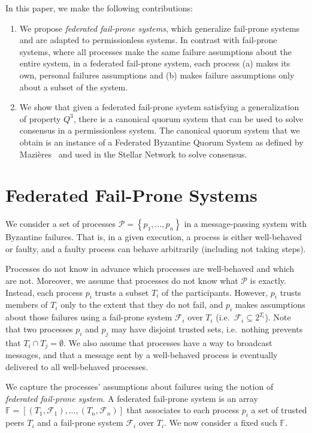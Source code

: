 \documentclass[11pt]{article}
\begin{document}
In this paper, we make the following contributions:
\begin{enumerate}
  \item
    We propose \emph{federated fail-prone systems}, which generalize fail-prone systems and are adapted to permissionless systems.
    In contrast with fail-prone systems, where all processes make the same failure assumptions about the entire system, in a federated fail-prone system, each process (a) makes its own, personal failures assumptions and (b) makes failure assumptions only about a subset of the system.
  \item
    We show that given a federated fail-prone system satisfying a generalization of property $Q^3$, there is a canonical quorum system that can be used to solve consensus in a permissionless system.
    The canonical quorum system that we obtain is an instance of a Federated Byzantine Quorum System as defined by Mazières~\cite{MazieresStellarConsensusProtocol2015} and used in the Stellar Network to solve consensus.
\end{enumerate}

\section{Federated Fail-Prone Systems}
\label{sec:basic}

We consider a set of processes $\mathcal{P}=\left\{p_1,...,p_n\right\}$ in a message-passing system with Byzantine failures.
That is, in a given execution, a process is either well-behaved or faulty, and a faulty process can behave arbitrarily (including not taking steps).

Processes do not know in advance which processes are well-behaved and which are not.
Moreover, we assume that processes do not know what $\mathcal{P}$ is exactly.
Instead, each process $p_i$ trusts a subset $T_i$ of the participants.
However, $p_i$ trusts members of $T_i$ only to the extent that they do not fail, and $p_i$ makes assumptions about those failures using a fail-prone system $\mathcal{F}_i$ over $T_i$ (i.e.\ $\mathcal{F}_i\subseteq 2^{T_i}$).
Note that two processes $p_i$ and $p_j$ may have disjoint trusted sets, i.e.\ nothing prevents that $T_i\cap T_j=\emptyset$.
We also assume that processes have a way to broadcast messages, and that a message sent by a well-behaved process is eventually delivered to all well-behaved processes.

We capture the processes' assumptions about failures using the notion of \emph{federated fail-prone system}. A federated fail-prone system is an array $\mathbb{F}=\left[\left(T_1,\mathcal{F}_1\right),...,\left(T_n,\mathcal{F}_n\right)\right]$ that associates to each process $p_i$ a set of trusted peers $T_i$ and a fail-prone system $\mathcal{F}_i$ over $T_i$.
We now consider a fixed such $\mathbb{F}$.
\end{document}
